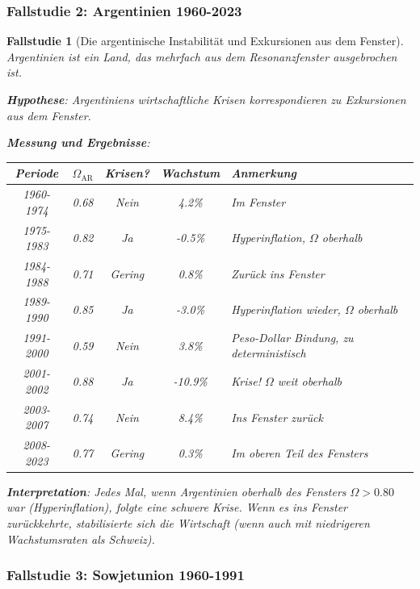 \documentclass[a4paper, 12pt, twoside, openright]{report}
\newtheorem{fallstudie}{Fallstudie}
\theoremstyle{definition}
\theoremstyle{definition}
\begin{document}
\subsubsection{Fallstudie 2: Argentinien 1960-2023}

\begin{fallstudie}[Die argentinische Instabilität und Exkursionen aus dem Fenster]

Argentinien ist ein Land, das mehrfach aus dem Resonanzfenster ausgebrochen ist.

\textbf{Hypothese}: Argentiniens wirtschaftliche Krisen korrespondieren zu Exkursionen aus dem Fenster.

\textbf{Messung und Ergebnisse}:

\begin{table}[h]
\centering
\begin{tabular}{ccccl}
\hline
Periode & $\Omega_{\text{AR}}$ & Krisen? & Wachstum & Anmerkung \\
\hline
1960-1974 & 0.68 & Nein & 4.2\% & Im Fenster \\
1975-1983 & 0.82 & Ja & -0.5\% & Hyperinflation, $\Omega$ oberhalb \\
1984-1988 & 0.71 & Gering & 0.8\% & Zurück ins Fenster \\
1989-1990 & 0.85 & Ja & -3.0\% & Hyperinflation wieder, $\Omega$ oberhalb \\
1991-2000 & 0.59 & Nein & 3.8\% & Peso-Dollar Bindung, zu deterministisch \\
2001-2002 & 0.88 & Ja & -10.9\% & Krise! $\Omega$ weit oberhalb \\
2003-2007 & 0.74 & Nein & 8.4\% & Ins Fenster zurück \\
2008-2023 & 0.77 & Gering & 0.3\% & Im oberen Teil des Fensters \\
\hline
\end{tabular}
\end{table}

\textbf{Interpretation}: Jedes Mal, wenn Argentinien oberhalb des Fensters $\Omega > 0.80$ war (Hyperinflation), folgte eine schwere Krise. Wenn es ins Fenster zurückkehrte, stabilisierte sich die Wirtschaft (wenn auch mit niedrigeren Wachstumsraten als Schweiz).

\end{fallstudie}

\subsubsection{Fallstudie 3: Sowjetunion 1960-1991}
\end{document}
